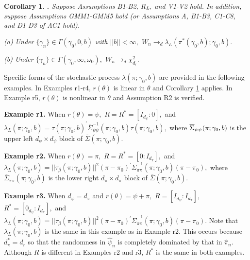 \documentclass[12pt,thmsb,titlepage,final,oneside,letterpaper]{article}
\newtheorem{corollary}{Corollary}[section]
\begin{document}
\begin{corollary}
\hspace{-0.08in}\textbf{.} \label{Cor Wald Linear}Suppose Assumptions \emph{%
B1-B2, R}$_{\text{\emph{L}}},$ and \emph{V1-V2} hold. In addition, suppose
Assumptions \emph{GMM1-GMM5 }hold \emph{(}or Assumptions \emph{A, B1-B3,
C1-C8, }and \emph{D1-D3 }of \emph{AC1 }hold\emph{).}

\noindent \emph{(a) }Under $\{\gamma _{n}\}\in \Gamma (\gamma _{0},0,b)$
with $||b||<\infty ,$ $W_{n}\rightarrow _{d}\lambda _{L}(\pi ^{\ast }(\gamma
_{0},b);\gamma _{0},b).$

\noindent \emph{(b) }Under $\{\gamma _{n}\}\in \Gamma (\gamma _{0},\infty
,\omega _{0}),$ $W_{n}\rightarrow _{d}\chi _{d_{r}}^{2}.$
\end{corollary}

Specific forms of the stochastic process $\lambda (\pi ;\gamma _{0},b)$ are
provided in the following examples. In Examples r1-r4, $r(\theta )$ is
linear in $\theta $ and Corollary \ref{Cor Wald Linear} applies. In Example
r5, $r(\theta )$ is nonlinear in $\theta $ and Assumption R2 is
verified.\medskip

\noindent \textbf{Example r1.}\label{exp 1} When $r(\theta )=\psi ,$ $%
R=R^{\ast }=[I_{d_{\psi }}:0],$ and $\lambda _{L}(\pi ;\gamma _{0},b)=\tau
(\pi ;\gamma _{0},b)^{\prime }\overline{\Sigma }_{\psi \psi }^{-1}(\pi
;\allowbreak \gamma _{0},b)\tau (\pi ;\gamma _{0},b),$ where $\overline{%
\Sigma }_{\psi \psi }(\pi ;\gamma _{0},b)$ is the upper left $d_{\psi
}\times d_{\psi }$ block of $\overline{\Sigma }(\pi ;\gamma _{0},b).$\medskip

\noindent \textbf{Example r2.}\label{exp 2} When $r(\theta )=\pi ,$ $%
R=R^{\ast }=[0:I_{d_{\pi }}],$ and $\lambda _{L}(\pi ;\gamma _{0},b)=||\tau
_{\beta }(\pi ;\gamma _{0},b)||^{2}(\pi -\pi _{0})^{\prime }\allowbreak 
\overline{\Sigma }_{\pi \pi }^{-1}(\pi ;\gamma _{0},b)(\pi -\pi _{0}),$
where $\overline{\Sigma }_{\pi \pi }(\pi ;\gamma _{0},b)$ is the lower right 
$d_{\pi }\times d_{\pi }$ block of $\overline{\Sigma }(\pi ;\gamma _{0},b).$%
\medskip

\noindent \textbf{Example r3.}\label{exp 3} When $d_{\psi }=d_{\pi }$ and $%
r(\theta )=\psi +\pi ,$ $R=[I_{d_{\psi }}:I_{d_{\pi }}],$ $R^{\ast
}=[0_{d_{\psi }}:I_{d_{\pi }}],$ and $\lambda _{L}(\pi ;\gamma
_{0},b)=||\tau _{\beta }(\pi ;\gamma _{0},b)||^{2}(\pi -\pi _{0})^{\prime }%
\overline{\Sigma }_{\pi \pi }^{-1}(\pi ;\gamma _{0},b)(\pi -\pi _{0}).$ Note
that $\lambda _{L}(\pi ;\gamma _{0},b)$ is the same in this example as in
Example r2. This occurs because $d_{\pi }^{\ast }=d_{r}$ so that the
randomness in $\widehat{\psi }_{n}$ is completely dominated by that in $%
\widehat{\pi }_{n}.$ Although $R$ is different in Examples r2 and r3, $%
R^{\ast }$ is the same in both examples.\medskip
\end{document}
